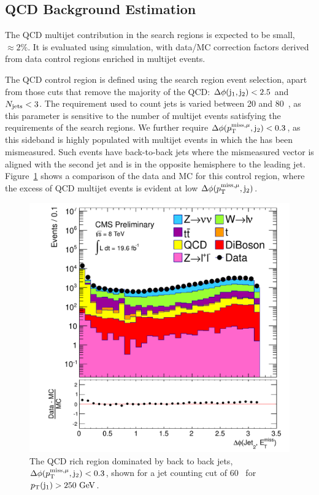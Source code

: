 \subsection{QCD Background Estimation}
\label{section:QCD}

The QCD multijet contribution in the search regions is expected to be small, $\approx 2\%$.
It is evaluated using simulation, with data/MC correction factors derived from data control regions enriched in multijet events.

The QCD control region is defined using the search region event selection, 
apart from those cuts that remove the majority of the QCD: $\Delta \phi({\rm j}_1, {\rm j}_2)<2.5$ and $N_{\text{jets}} < 3$.
The \pt{} requirement used to count jets is varied between 20 and 80~\GeV, as this parameter is sensitive to the number of multijet events satisfying the requirements of the search regions. 
We further require $\Delta \phi (p^{\rm miss, \mu}_{\rm T}, {\rm j}_{2}) < 0.3$, as this sideband is highly populated with multijet events in which the \MET has been mismeasured. 
Such events have back-to-back jets where the mismeasured \METvmu vector is aligned with the second jet and is in the opposite hemisphere to the leading jet. 
Figure~\ref{dphi_METj2} shows a comparison of the data and MC for this control region, where the excess of QCD multijet events is evident at low  $\Delta \phi (p^{\rm miss, \mu}_{\rm T},{\rm j}_{2})$.


\begin{figure}[htbp!]
\begin{center}
 \includegraphics[scale=0.4]{Figures/sus13009/dPhi_MetLep_Jet2.pdf}
\caption{The QCD rich region dominated by back to back jets, $\Delta \phi(p^{\rm miss, \mu}_{\rm T}, {\rm j}_2)<0.3$, shown for a jet counting cut of 60~\GeV{} for $p_{\text{T}}({\rm j}_1) > 250~\mathrm{GeV}$.}
\label{dphi_METj2}
\end{center}
\end{figure}


